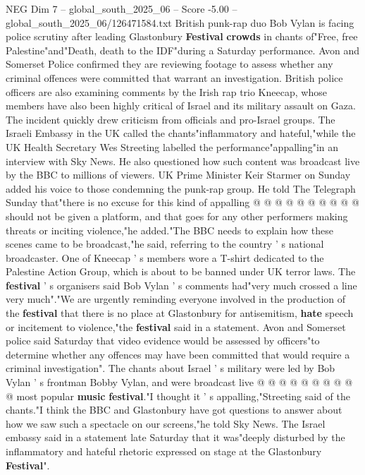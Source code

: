 \begin{textsample}{NEG Dim 7 – global\_south\_2025\_06 – Score -5.00 – global\_south\_2025\_06/126471584.txt}  \label{ex:f7_neg_280}
British punk-rap duo Bob Vylan is facing police scrutiny after leading Glastonbury \textbf{Festival} \textbf{crowds} in chants of"Free, free Palestine"and"Death, death to the IDF"during a Saturday performance.
Avon and Somerset Police confirmed they are reviewing footage to assess whether any criminal offences were committed that warrant an investigation.
British police officers are also examining comments by the Irish rap trio Kneecap, whose members have also been highly critical of Israel and its military assault on Gaza.
The incident quickly drew criticism from officials and pro-Israel groups.
The Israeli Embassy in the UK called the chants"inflammatory and hateful,"while the UK Health Secretary Wes Streeting labelled the performance"appalling"in an interview with Sky News.
He also questioned how such content was broadcast live by the BBC to millions of viewers.
UK Prime Minister Keir Starmer on Sunday added his voice to those condemning the punk-rap group.
He told The Telegraph Sunday that"there is no excuse for this kind of appalling @ @ @ @ @ @ @ @ @ @ should not be given a platform, and that goes for any other performers making threats or inciting violence,"he added."The BBC needs to explain how these scenes came to be broadcast,"he said, referring to the country ' s national broadcaster.
One of Kneecap ' s members wore a T-shirt dedicated to the Palestine Action Group, which is about to be banned under UK terror laws.
The \textbf{festival} ' s organisers said Bob Vylan ' s comments had"very much crossed a line very much"."We are urgently reminding everyone involved in the production of the \textbf{festival} that there is no place at Glastonbury for antisemitism, \textbf{hate} speech or incitement to violence,"the \textbf{festival} said in a statement.
Avon and Somerset police said Saturday that video evidence would be assessed by officers"to determine whether any offences may have been committed that would require a criminal investigation".
The chants about Israel ' s military were led by Bob Vylan ' s frontman Bobby Vylan, and were broadcast live @ @ @ @ @ @ @ @ @ @ most popular \textbf{music} \textbf{festival}."I thought it ' s appalling,"Streeting said of the chants."I think the BBC and Glastonbury have got questions to answer about how we saw such a spectacle on our screens,"he told Sky News.
The Israel embassy said in a statement late Saturday that it was"deeply disturbed by the inflammatory and hateful rhetoric expressed on stage at the Glastonbury \textbf{Festival}".

\end{textsample}
